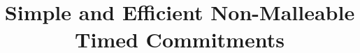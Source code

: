 \documentclass{llncs}
\begin{document}
\title{Simple and Efficient Non-Malleable Timed Commitments}




\maketitle
%















\end{document}

